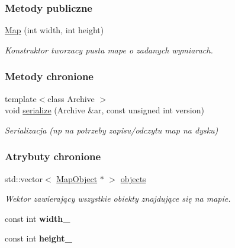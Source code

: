 \subsubsection*{Metody publiczne}
\begin{DoxyCompactItemize}
\item 
\hypertarget{classcommon_1_1Map_ad5d9001f272e6505d23331ca0aba0eae}{\hyperlink{classcommon_1_1Map_ad5d9001f272e6505d23331ca0aba0eae}{Map} (int width, int height)}\label{classcommon_1_1Map_ad5d9001f272e6505d23331ca0aba0eae}

\begin{DoxyCompactList}\small\item\em Konstruktor tworzacy pusta mape o zadanych wymiarach. \end{DoxyCompactList}\end{DoxyCompactItemize}
\subsubsection*{Metody chronione}
\begin{DoxyCompactItemize}
\item 
{\footnotesize template$<$class Archive $>$ }\\void \hyperlink{classcommon_1_1Map_adea5eca91ec93db01ec5920bb26a3fd3}{serialize} (Archive \&ar, const unsigned int version)
\begin{DoxyCompactList}\small\item\em Serializacja (np na potrzeby zapisu/odczytu map na dysku) \end{DoxyCompactList}\end{DoxyCompactItemize}
\subsubsection*{Atrybuty chronione}
\begin{DoxyCompactItemize}
\item 
std\-::vector$<$ \hyperlink{classcommon_1_1MapObject}{Map\-Object} $\ast$ $>$ \hyperlink{classcommon_1_1Map_a810206d6817e73a9f60344c42ce40178}{objects}
\begin{DoxyCompactList}\small\item\em Wektor zawierający wszystkie obiekty znajdujące się na mapie. \end{DoxyCompactList}\item 
\hypertarget{classcommon_1_1Map_a4e9586b5ad7531981905a30ca698994c}{const int {\bfseries width\-\_\-}}\label{classcommon_1_1Map_a4e9586b5ad7531981905a30ca698994c}

\item 
\hypertarget{classcommon_1_1Map_a08fe5509a04b58dc54e075f92608bf98}{const int {\bfseries height\-\_\-}}\label{classcommon_1_1Map_a08fe5509a04b58dc54e075f92608bf98}

\end{DoxyCompactItemize}
